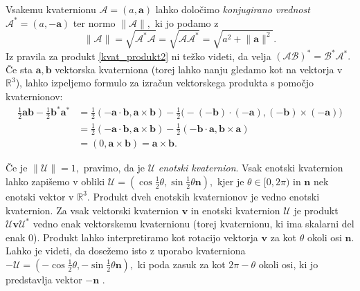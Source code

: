 \documentclass[12pt,a4paper,twoside]{article}
\theoremstyle{definition} %
\theoremstyle{plain} %
\theoremstyle{primerstyle}
\numberwithin{equation}{section}  %
\newcommand{\R}{\mathbb R}
\newcommand{\aV}{\mathbf{a}}
\newcommand{\bV}{\mathbf{b}}
\newcommand{\nV}{\mathbf{n}}
\newcommand{\vV}{\mathbf{v}}
\newcommand{\AQ}{\mathcal{A}}
\newcommand{\BQ}{\mathcal{B}}
\newcommand{\UQ}{\mathcal{U}}
\begin{document}
Vsakemu kvaternionu $\AQ=(a,\aV)$ lahko določimo \emph{konjugirano vrednost} $\AQ^*=(a,-\aV)$ ter normo $\lVert\AQ\rVert,$ ki jo podamo z
\begin{equation}
	\label{kvat_norma}
	\lVert\AQ\rVert=\sqrt{\AQ^*\AQ}=\sqrt{\AQ\AQ^*}=\sqrt{a^2+\lVert\aV\rVert^2}.
\end{equation}
Iz pravila za produkt \eqref{kvat_produkt2} ni težko videti, da velja $(\AQ\BQ)^*=\BQ^*\AQ^*.$ Če sta $\aV,\bV$ vektorska kvaterniona (torej lahko nanju gledamo kot na vektorja v $\R^3$), lahko izpeljemo formulo za izračun vektorskega produkta s pomočjo kvaternionov:
\begin{align}
	\frac{1}{2}\aV\bV-\frac{1}{2}\bV^*\aV^*&=\frac{1}{2}(-\aV\cdot\bV,\aV\times\bV)-\frac{1}{2}\big(-(-\bV)\cdot(-\aV),(-\bV)\times(-\aV)\big)\nonumber\\
	&=\frac{1}{2}(-\aV\cdot\bV,\aV\times\bV)-\frac{1}{2}(-\bV\cdot\aV,\bV\times\aV)\label{kvat_vekt_prod}\\
	&=(0,\aV\times\bV)=\aV\times\bV.\nonumber
\end{align}

Če je $\lVert\UQ\rVert=1,$ pravimo, da je $\UQ$ \emph{enotski kvaternion}. Vsak enotski kvaternion lahko zapišemo v obliki $\UQ=(\cos\frac{1}{2}\theta,\sin\frac{1}{2}\theta\nV),$ kjer je $\theta\in[0,2\pi)$ in $\nV$ nek enotski vektor v $\R^3.$ Produkt dveh enotskih kvaternionov je vedno enotski kvaternion. Za vsak vektorski kvaternion $\vV$ in enotski kvaternion $\UQ$ je produkt $\UQ\vV\UQ^*$ vedno enak vektorskemu kvaternionu (torej kvaternionu, ki ima skalarni del enak 0). Produkt lahko interpretiramo kot rotacijo vektorja $\vV$ za kot $\theta$ okoli osi $\nV.$ Lahko je videti, da dosežemo isto z uporabo kvaterniona $-\UQ=(-\cos\frac{1}{2}\theta,-\sin\frac{1}{2}\theta\nV),$ ki poda zasuk za kot $2\pi-\theta$ okoli osi, ki jo predstavlja vektor $-\nV$ \cite[str. 387]{faroukietal2004}.
\end{document}
